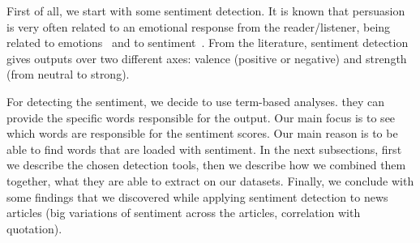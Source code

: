 First of all, we start with some sentiment detection. It is known that persuasion is very often related to an emotional response from the reader/listener, being related to emotions~\citep{rocklage2018persuasion,petty2015emotion,desteno2004discrete} and to sentiment~\citep{gatti2014sentiment}.
From the literature, sentiment detection gives outputs over two different axes: valence (positive or negative) and strength (from neutral to strong).

For detecting the sentiment, we decide to use term-based analyses. %
they can provide the specific words responsible for the output.
Our main focus is to see which words are responsible for the sentiment scores. %
Our main reason is to be able to find words that are loaded with sentiment. %
In the next subsections, first we describe the chosen detection tools, then we describe how we combined them together, what they are able to extract on our datasets. Finally, we conclude with some findings that we discovered while applying sentiment detection to news articles (big variations of sentiment across the articles, correlation with quotation).

